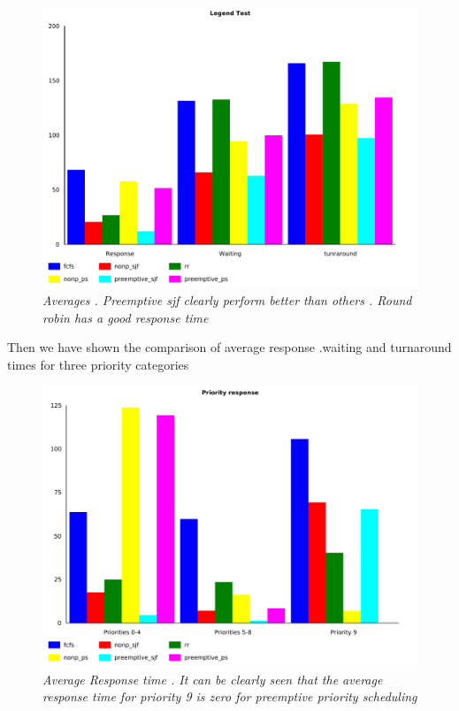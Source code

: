 \documentclass{article}
\begin{document}
\begin{figure}[ht]
\centerline{\includegraphics[scale=1]{averages}}
\caption{{\it Averages . Preemptive sjf clearly perform better than others . Round robin has a good response time}}  
\label{surf}
\end{figure} 
Then we have shown the comparison of average response .waiting and turnaround times for three priority categories 
\begin{figure}[ht]
\centerline{\includegraphics[scale=1]{priority_response_averages}}
\caption{{\it Average Response time . It can be clearly seen that the average response time for priority 9 is zero for preemptive priority scheduling}}  
\label{surf}
\end{figure}
\end{document}
